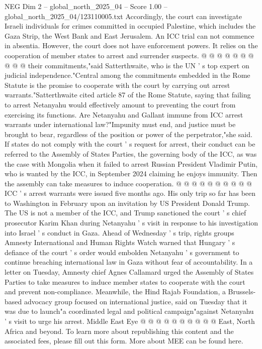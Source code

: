 \begin{textsample}{NEG Dim 2 – global\_north\_2025\_04 – Score 1.00 – global\_north\_2025\_04/123110005.txt}
Accordingly, the court can investigate Israeli individuals for crimes committed in occupied Palestine, which includes the Gaza Strip, the West Bank and East Jerusalem.
An ICC trial can not commence in absentia.
However, the court does not have enforcement powers.
It relies on the cooperation of member states to arrest and surrender suspects. @ @ @ @ @ @ @ @ @ @ their commitments,"said Satterthwaite, who is the UN ' s top expert on judicial independence."Central among the commitments embedded in the Rome Statute is the promise to cooperate with the court by carrying out arrest warrants."Satterthwaite cited article 87 of the Rome Statute, saying that failing to arrest Netanyahu would effectively amount to preventing the court from exercising its functions.
Are Netanyahu and Gallant immune from ICC arrest warrants under international law?"Impunity must end, and justice must be brought to bear, regardless of the position or power of the perpetrator,"she said.
If states do not comply with the court ' s request for arrest, their conduct can be referred to the Assembly of States Parties, the governing body of the ICC, as was the case with Mongolia when it failed to arrest Russian President Vladimir Putin, who is wanted by the ICC, in September 2024 claiming he enjoys immunity.
Then the assembly can take measures to induce cooperation. @ @ @ @ @ @ @ @ @ @ ICC ' s arrest warrants were issued five months ago.
His only trip so far has been to Washington in February upon an invitation by US President Donald Trump.
The US is not a member of the ICC, and Trump sanctioned the court ' s chief prosecutor Karim Khan during Netanyahu ' s visit in response to his investigation into Israel ' s conduct in Gaza.
Ahead of Wednesday ' s trip, rights groups Amnesty International and Human Rights Watch warned that Hungary ' s defiance of the court ' s order would embolden Netanyahu ' s government to continue breaching international law in Gaza without fear of accountability.
In a letter on Tuesday, Amnesty chief Agnes Callamard urged the Assembly of States Parties to take measures to induce member states to cooperate with the court and prevent non-compliance.
Meanwhile, the Hind Rajab Foundation, a Brussels-based advocacy group focused on international justice, said on Tuesday that it was due to launch"a coordinated legal and political campaign"against Netanyahu ' s visit to urge his arrest.
Middle East Eye @ @ @ @ @ @ @ @ @ @ East, North Africa and beyond.
To learn more about republishing this content and the associated fees, please fill out this form.
More about MEE can be found here.

\end{textsample}
